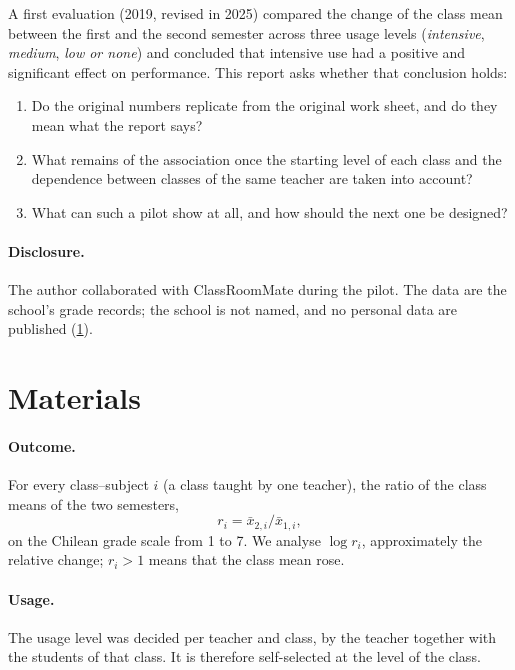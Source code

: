 \documentclass[11pt,a4paper]{article}
\begin{document}
A first evaluation (2019, revised in 2025) compared the change of the class mean between the first and the second
semester across three usage levels (\emph{intensive}, \emph{medium}, \emph{low or none}) and concluded that
intensive use had a positive and significant effect on performance. This report asks whether that conclusion holds:
\begin{enumerate}
  \item Do the original numbers replicate from the original work sheet, and do they mean what the report says?
  \item What remains of the association once the starting level of each class and the dependence between classes of
        the same teacher are taken into account?
  \item What can such a pilot show at all, and how should the next one be designed?
\end{enumerate}

\paragraph{Disclosure.} The author collaborated with ClassRoomMate during the pilot. The data are the school's
grade records; the school is not named, and no personal data are published (\cref{sec:data}).

\section{Materials}\label{sec:data}

\paragraph{Outcome.} For every class--subject $i$ (a class taught by one teacher), the ratio of the class means of the
two semesters,
\[
  r_i = \bar x_{2,i} / \bar x_{1,i},
\]
on the Chilean grade scale from 1 to 7. We analyse $\log r_i$, approximately the relative change; $r_i > 1$ means that
the class mean rose.

\paragraph{Usage.} The usage level was decided per teacher and class, by the teacher together with the students of
that class. It is therefore self-selected at the level of the class.
\end{document}
